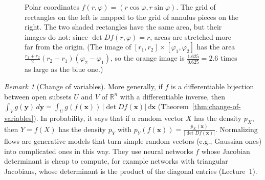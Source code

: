 \documentclass[11pt]{article}
\theoremstyle{definition}
\theoremstyle{plain}
\theoremstyle{remark}
\newtheorem{remark}[definition]{Remark}
\begin{document}
\begin{figure}[ht]
    \centering
    \caption{Polar coordinates $f(r, \varphi) = (r\cos\varphi, r\sin\varphi)$. The grid of rectangles on the left is mapped to the grid of annulus pieces on the right. The two shaded rectangles have the same area, but their images do not: since $\det Df(r, \varphi) = r$, areas are stretched more far from the origin. (The image of $[r_1, r_2] \times [\varphi_1, \varphi_2]$ has the area $\frac{r_1 + r_2}{2}(r_2 - r_1)(\varphi_2 - \varphi_1)$, so the orange image is $\frac{1.625}{0.625} = 2.6$ times as large as the blue one.)}
    \label{fig:polar}
\end{figure}

\begin{remark}[Change of variables]\label{rem:change-of-variables}
    More generally, if $f$ is a differentiable bijection between open subsets $U$ and $V$ of $\mathbb{R}^n$ with a differentiable inverse, then $\int_V g(\mathbf{y}) \, d\mathbf{y} = \int_U g(f(\mathbf{x})) \, |\det Df(\mathbf{x})| \, d\mathbf{x}$ (Theorem~\ref{thm:change-of-variables}). In probability, it says that if a random vector $X$ has the density $p_X$, then $Y = f(X)$ has the density $p_Y$ with $p_Y(f(\mathbf{x})) = \frac{p_X(\mathbf{x})}{|\det Df(\mathbf{x})|}$. Normalizing flows are generative models that turn simple random vectors (e.g., Gaussian ones) into complicated ones in this way. They use neural networks $f$ whose Jacobian determinant is cheap to compute, for example networks with triangular Jacobians, whose determinant is the product of the diagonal entries (Lecture~1).
\end{remark}
\end{document}
